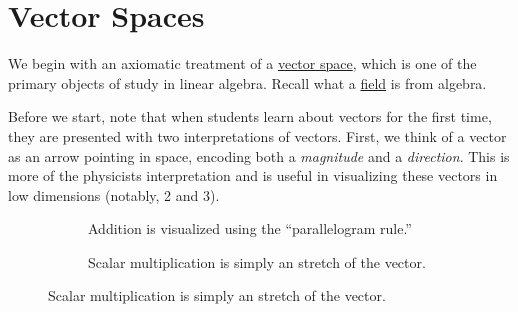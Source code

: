 \section{Vector Spaces}

  We begin with an axiomatic treatment of a \hyperref[alg-def:vector-space]{vector space}, which is one of the primary objects of study in linear algebra. Recall what a \hyperref[alg-def:field]{field} is from algebra. 

  Before we start, note that when students learn about vectors for the first time, they are presented with two interpretations of vectors. First, we think of a vector as an arrow pointing in space, encoding both a \textit{magnitude} and a \textit{direction}. This is more of the physicists interpretation and is useful in visualizing these vectors in low dimensions (notably, 2 and 3). 

  \begin{figure}[H]
    \centering
    \begin{subfigure}[b]{0.48\textwidth}
      \centering
      \caption{Addition is visualized using the ``parallelogram rule.''}
      \label{fig:vector-addition}
    \end{subfigure}
    \begin{subfigure}[b]{0.48\textwidth}
      \centering
      \caption{Scalar multiplication is simply an stretch of the vector.}
      \label{fig:scalar-multiplication}
    \end{subfigure}
  \end{figure}

